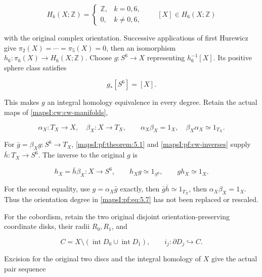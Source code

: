 \begin{equation}
H_k(X;\mathbb Z)=
\begin{cases}\mathbb Z,&k=0,6,\\0,&k\ne0,6,\end{cases}
\qquad [X]\in H_6(X;\mathbb Z)
\label{mapsI:pf:eq:5.6}
\end{equation}

with the original complex orientation. Successive applications of first Hurewicz give \(\pi_2(X)=\cdots=\pi_5(X)=0\), then an isomorphism \(h_6:\pi_6(X)\to H_6(X;\mathbb Z)\). Choose \(g:S^6\to X\) representing \(h_6^{-1}[X]\). Its positive sphere class satisfies

\begin{equation}
g_*[S^6]=[X].
\label{mapsI:pf:eq:5.7}
\end{equation}

This makes \(g\) an integral homology equivalence in every degree. Retain the actual maps of \cref{mapsI:cw:cw-manifolds},

\begin{equation}
\alpha_X:T_X\to X,\quad\beta_X:X\to T_X,\qquad
\alpha_X\beta_X=1_X,\quad\beta_X\alpha_X\simeq1_{T_X}.
\label{mapsI:pf:eq:5.8}
\end{equation}

For \(\bar g=\beta_Xg:S^6\to T_X\), \cref{mapsI:pf:theorem:5.1} and \cref{mapsI:pf:cw-inverses} supply \(\bar h:T_X\to S^6\). The inverse to the original \(g\) is

\begin{equation}
h_X=\bar h\beta_X:X\to S^6,\qquad
h_Xg\simeq1_{S^6},\qquad gh_X\simeq1_X.
\label{mapsI:pf:eq:5.9}
\end{equation}

For the second equality, use \(g=\alpha_X\bar g\) exactly, then \(\bar g\bar h\simeq1_{T_X}\), then \(\alpha_X\beta_X=1_X\). Thus the orientation degree in \eqref{mapsI:pf:eq:5.7} has not been replaced or rescaled.

For the cobordism, retain the two original disjoint orientation-preserving coordinate disks, their radii \(R_0,R_1\), and

\begin{equation}
C=X\setminus(\operatorname{int}D_0\cup\operatorname{int}D_1),
\qquad i_j:\partial D_j\hookrightarrow C.
\label{mapsI:pf:eq:5.10}
\end{equation}

Excision for the original two discs and the integral homology of \(X\) give the actual pair sequence

